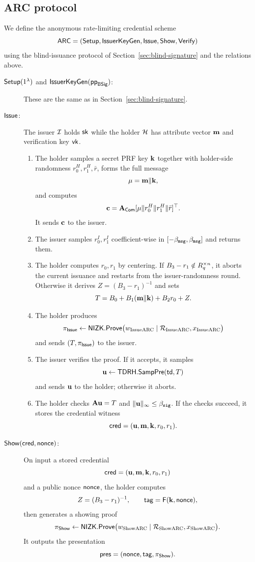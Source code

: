 \subsection{ARC protocol}
We define the anonymous rate-limiting credential scheme
\[
  \mathsf{ARC}=(\mathsf{Setup},\mathsf{IssuerKeyGen},\mathsf{Issue},\mathsf{Show},\mathsf{Verify})
\]
using the blind-issuance protocol of Section~\ref{sec:blind-signature} and the relations above.

\begin{description}
\item[$\mathsf{Setup}(1^\lambda)$ and $\mathsf{IssuerKeyGen}(\mathsf{pp}_{\mathsf{BSig}})$:] These are the same as in
Section~\ref{sec:blind-signature}.

\item[$\mathsf{Issue}$:] The issuer $\mathcal{I}$ holds $\mathsf{sk}$ while the holder $\mathcal{H}$ has attribute vector $\mathbf{m}$ and
verification key $\mathsf{vk}$.
\begin{enumerate}[leftmargin=1.25em]
  \item The holder samples a secret PRF key $\mathbf{k}$ together with holder-side randomness
  $r_0^H,r_1^H,\bar r$, forms the full message
  \[
    \mathbf{\mu}=\mathbf{m}\Vert\mathbf{k},
  \]
  and computes
  \[
    \mathbf{c}=\mathbf{A}_{\mathsf{Com}}[\mathbf{\mu}\Vert r_0^H\Vert r_1^H\Vert \bar r]^\top.
  \]
  It sends $\mathbf{c}$ to the issuer.
  \item The issuer samples $r_0^I,r_1^I$ coefficient-wise in $[-\beta_{\mathtt{msg}},\beta_{\mathtt{msg}}]$ and returns them.
  \item The holder computes $r_0,r_1$ by centering.  If $B_3-r_1\notin R_q^{\times n}$, it aborts the current
  issuance and restarts from the issuer-randomness round.  Otherwise it derives $Z=(B_3-r_1)^{-1}$ and sets
  \[
    T=B_0+B_1(\mathbf{m}\Vert\mathbf{k})+B_2r_0+Z.
  \]
  \item The holder produces
  \[
    \pi_{\mathsf{Issue}}\gets \mathsf{NIZK}.\mathsf{Prove}
      \bigl(w_{\mathrm{IssueARC}}\mid \mathcal R_{\mathrm{IssueARC}},x_{\mathrm{IssueARC}}\bigr)
  \]
  and sends $(T,\pi_{\mathsf{Issue}})$ to the issuer.
  \item The issuer verifies the proof.  If it accepts, it samples
  \[
    \mathbf{u}\gets\mathsf{TDRH}.\mathsf{SampPre}(\mathsf{td},T)
  \]
  and sends $\mathbf{u}$ to the holder; otherwise it aborts.
  \item The holder checks $\mathbf{A}\mathbf{u}=T$ and $\|\mathbf{u}\|_\infty\le\beta_{\mathtt{sig}}$.  If the checks succeed, it stores the
  credential witness
  \[
    \mathsf{cred}=(\mathbf{u},\mathbf{m},\mathbf{k},r_0,r_1).
  \]
\end{enumerate}

\item[$\mathsf{Show}(\mathsf{cred},\mathsf{nonce})$:] On input a stored credential
\[
  \mathsf{cred}=(\mathbf{u},\mathbf{m},\mathbf{k},r_0,r_1)
\]
and a public nonce $\mathsf{nonce}$, the holder computes
\[
  Z=(B_3-r_1)^{-1},
  \qquad
  \mathsf{tag}=\mathsf{F}(\mathbf{k},\mathsf{nonce}),
\]
then generates a showing proof
\[
  \pi_{\mathsf{Show}}\gets \mathsf{NIZK}.\mathsf{Prove}
    \bigl(w_{\mathrm{ShowARC}}\mid \mathcal R_{\mathrm{ShowARC}},x_{\mathrm{ShowARC}}\bigr).
\]
It outputs the presentation
\[
  \mathsf{pres}=(\mathsf{nonce},\mathsf{tag},\pi_{\mathsf{Show}}).
\]


\end{description}
